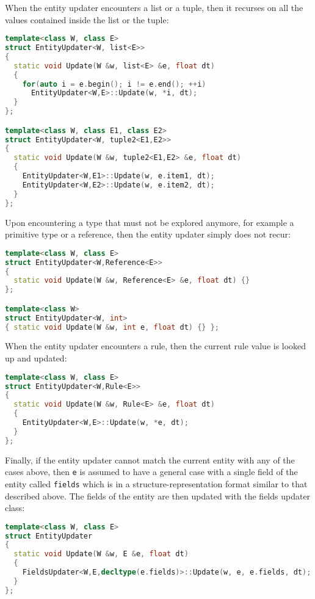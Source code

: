When the entity updater encounters a list or a tuple, then it recurses on all the values contained inside the list or the tuple:

\begin{lstlisting}[language=C++]
template<class W, class E>
struct EntityUpdater<W, list<E>>
{
  static void Update(W &w, list<E> &e, float dt) 
  {
    for(auto i = e.begin(); i != e.end(); ++i)
      EntityUpdater<W,E>::Update(w, *i, dt);
  }
};

template<class W, class E1, class E2>
struct EntityUpdater<W, tuple2<E1,E2>>
{
  static void Update(W &w, tuple2<E1,E2> &e, float dt) 
  {
    EntityUpdater<W,E1>::Update(w, e.item1, dt);
    EntityUpdater<W,E2>::Update(w, e.item2, dt);
  }
};
\end{lstlisting}

Upon encountering a type that must not be explored anymore, for example a primitive type or a reference, then the entity updater simply does not recur:

\begin{lstlisting}[language=C++]
template<class W, class E>
struct EntityUpdater<W,Reference<E>>
{
  static void Update(W &w, Reference<E> &e, float dt) {}
};

template<class W>
struct EntityUpdater<W, int> 
{ static void Update(W &w, int e, float dt) {} };
\end{lstlisting}

When the entity updater encounters a rule, then the current rule value is looked up and updated:

\begin{lstlisting}[language=C++]
template<class W, class E>
struct EntityUpdater<W,Rule<E>>
{
  static void Update(W &w, Rule<E> &e, float dt) 
  {
    EntityUpdater<W,E>::Update(w, *e, dt);
  }
};
\end{lstlisting}


Finally, if the entity updater cannot match the current entity with any of the cases above, then \texttt{e} is assumed to have a general case with a single field of the entity called \texttt{fields} which is in a structure-representation format similar to that described above. The fields of the entity are then updated with the fields updater class:

\begin{lstlisting}[language=C++]
template<class W, class E>
struct EntityUpdater
{
  static void Update(W &w, E &e, float dt) 
  {
    FieldsUpdater<W,E,decltype(e.fields)>::Update(w, e, e.fields, dt);
  }
};
\end{lstlisting}


